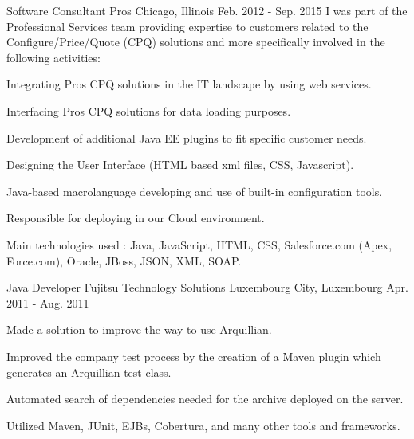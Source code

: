 \begin{cventries}
  \cventryfive
    {Software Consultant} %
    {Pros} %
    {Chicago, Illinois} %
    {Feb. 2012 - Sep. 2015} %
    {I was part of the Professional Services team providing expertise to customers related to the
Configure/Price/Quote (CPQ) solutions and more specifically involved in the following activities:}
    {
      \begin{cvitems} %
        	\item Integrating Pros CPQ solutions in the IT landscape by using web services.
		\item Interfacing Pros CPQ solutions for data loading purposes.
		\item Development of additional Java EE plugins to fit specific customer needs.
    		\item Designing the User Interface (HTML based xml files, CSS, Javascript).
    		\item Java-based macrolanguage developing and use of built-in configuration tools.
    		\item Responsible for deploying in our Cloud environment.
    		\item Main technologies used : Java, JavaScript, HTML, CSS, Salesforce.com (Apex, Force.com), Oracle, JBoss, JSON, XML, SOAP.
      \end{cvitems}
    }
    
  \cventry
    {Java Developer} %
    {Fujitsu Technology Solutions} %
    {Luxembourg City, Luxembourg} %
    {Apr. 2011 - Aug. 2011} %
    {
      \begin{cvitems} %
        	\item Made a solution to improve the way to use Arquillian.
		\item Improved the company test process by the creation of a Maven plugin which generates an Arquillian test class.
		\item Automated search of dependencies needed for the archive deployed on the server.
    		\item Utilized Maven, JUnit, EJBs, Cobertura, and many other tools and frameworks.
      \end{cvitems}
    }

\end{cventries}
